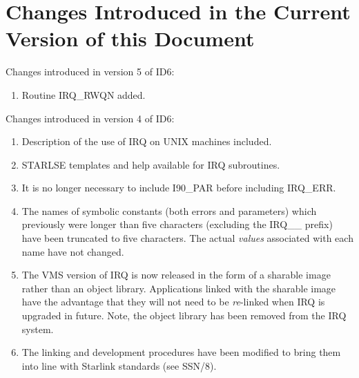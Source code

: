 \section {Changes Introduced in the Current Version of this Document}
\label {SEC:CHANGES}

Changes introduced in version 5 of ID6:
\begin {enumerate}
\item Routine IRQ\_RWQN added.
\end {enumerate}

Changes introduced in version 4 of ID6:
\begin {enumerate}
\item Description of the use of IRQ on UNIX machines included.
\item STARLSE templates and help available for IRQ subroutines.
\item It is no longer necessary to include I90\_PAR before including
IRQ\_ERR.
\item The names of symbolic constants (both errors and parameters) which previously
were longer than five characters (excluding the IRQ\_\_ prefix) have been
truncated to five characters. The actual {\em values} associated with each name
have not changed.
\item The VMS version of IRQ is now released in the form of a sharable image
rather than an object library. Applications linked with the sharable image have
the advantage that they will not need to be {\em re}-linked when IRQ is upgraded
in future. Note, the object library has been removed from the IRQ system.
\item The linking and development procedures have been modified to bring them
into line with Starlink standards (see SSN/8).

\end {enumerate}


